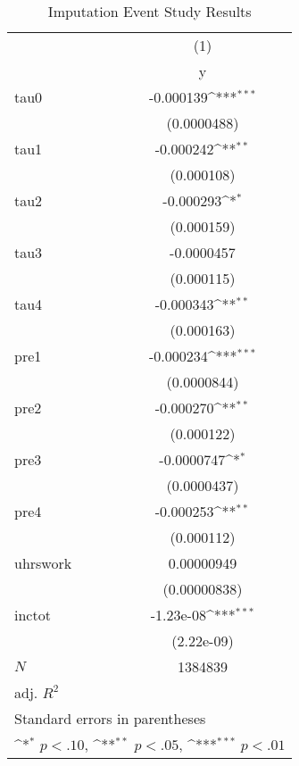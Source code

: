 \begin{table}[htbp]\centering
\def\sym#1{\ifmmode^{#1}\else\(^{#1}\)\fi}
\caption{Imputation Event Study Results}
\begin{tabular}{l*{1}{c}}
\hline\hline
            &\multicolumn{1}{c}{(1)}\\
            &\multicolumn{1}{c}{y}\\
\hline
tau0        &   -0.000139\sym{***}\\
            & (0.0000488)         \\
[1em]
tau1        &   -0.000242\sym{**} \\
            &  (0.000108)         \\
[1em]
tau2        &   -0.000293\sym{*}  \\
            &  (0.000159)         \\
[1em]
tau3        &  -0.0000457         \\
            &  (0.000115)         \\
[1em]
tau4        &   -0.000343\sym{**} \\
            &  (0.000163)         \\
[1em]
pre1        &   -0.000234\sym{***}\\
            & (0.0000844)         \\
[1em]
pre2        &   -0.000270\sym{**} \\
            &  (0.000122)         \\
[1em]
pre3        &  -0.0000747\sym{*}  \\
            & (0.0000437)         \\
[1em]
pre4        &   -0.000253\sym{**} \\
            &  (0.000112)         \\
[1em]
uhrswork    &  0.00000949         \\
            &(0.00000838)         \\
[1em]
inctot      &   -1.23e-08\sym{***}\\
            &  (2.22e-09)         \\
\hline
\(N\)       &     1384839         \\
adj. \(R^{2}\)&                     \\
\hline\hline
\multicolumn{2}{l}{\footnotesize Standard errors in parentheses}\\
\multicolumn{2}{l}{\footnotesize \sym{*} \(p<.10\), \sym{**} \(p<.05\), \sym{***} \(p<.01\)}\\
\end{tabular}
\end{table}
